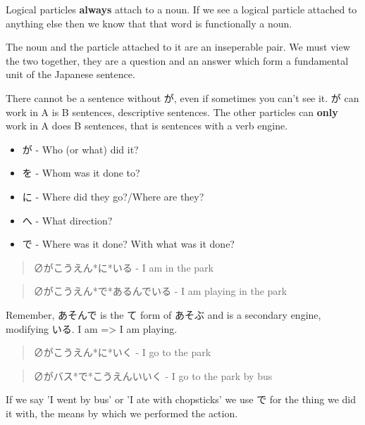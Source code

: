 \documentclass[11pt]{article}
\begin{document}
Logical particles \textbf{always} attach to a noun. If we see a logical particle attached to anything else then we know that that word is functionally a noun.

The noun and the particle attached to it are an inseperable pair. We must view the two together, they are a question and an answer which form a fundamental unit of the Japanese sentence.

There cannot be a sentence without が, even if sometimes you can't see it. が can work in A is B sentences, descriptive sentences. The other particles can \textbf{only} work in A does B sentences, that is sentences with a verb engine.
\begin{itemize}
\item が - Who (or what) did it?
\item を - Whom was it done to?
\item に - Where did they go?/Where are they?
\item へ - What direction?
\item で - Where was it done? With what was it done?
\end{itemize}
\begin{quote}
∅がこうえん*に*いる - I am in the park
\end{quote}
\begin{quote}
∅がこうえん*で*あるんでいる - I am playing in the park
\end{quote}
Remember, あそんで is the て form of あそぶ and is a secondary engine, modifying いる. I am => I am playing.
\begin{quote}
∅がこうえん*に*いく - I go to the park
\end{quote}
\begin{quote}
∅がバス*で*こうえんいいく - I go to the park by bus
\end{quote}
If we say 'I went by bus' or 'I ate with chopsticks' we use で for the thing we did it with, the means by which we performed the action.
\end{document}
